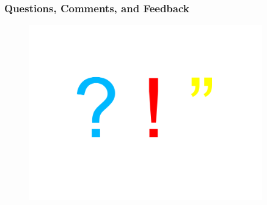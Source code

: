 \documentclass[first=dgreen,second=purple,logo=redexc]{aaltoslides}
\begin{document}



\begin{frame}
 \frametitle{Questions, Comments, and Feedback}
 \begin{figure}[h!]
 \centering
 \includegraphics[trim=1cm 1.5cm 1cm 3cm, clip=true, width=0.9\textwidth]{figures/questions}
 \end{figure}
 
%  
 
%  
 \end{frame}
 
\end{document}
